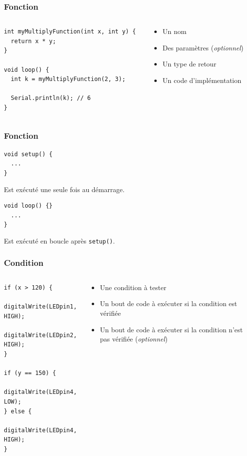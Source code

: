 \documentclass[aspectratio=169,utf8]{beamer}
\begin{document}
\begin{frame}[fragile]
  \frametitle{Fonction}
  \begin{columns}
    \begin{column}{.6\textwidth}
      \begin{lstlisting}
int myMultiplyFunction(int x, int y) {
  return x * y;
}

void loop() {
  int k = myMultiplyFunction(2, 3);

  Serial.println(k); // 6
}
      \end{lstlisting}
    \end{column}
    \begin{column}{.4\textwidth}
      \begin{itemize}
        \item Un nom
        \item Des paramètres (\emph{optionnel})
        \item Un type de retour
        \item Un code d’implémentation
      \end{itemize}
    \end{column}
  \end{columns}
\end{frame}

\begin{frame}[fragile]
  \frametitle{Fonction}
  \begin{lstlisting}
void setup() {
  ...
}
  \end{lstlisting}
  Est exécuté une seule fois au démarrage.

  \begin{lstlisting}[firstnumber=4]
void loop() {}
  ...
}
  \end{lstlisting}
  Est exécuté en boucle après \lstinline|setup()|.
\end{frame}

\begin{frame}[fragile]
\frametitle{Condition}
\begin{columns}
  \begin{column}{.5\textwidth}
    \begin{lstlisting}
if (x > 120) {
  digitalWrite(LEDpin1, HIGH);
  digitalWrite(LEDpin2, HIGH);
}

if (y == 150) {
  digitalWrite(LEDpin4, LOW);
} else {
  digitalWrite(LEDpin4, HIGH);
}
    \end{lstlisting}
  \end{column}
  \begin{column}{.5\textwidth}
    \begin{itemize}
      \item Une condition à tester
      \item Un bout de code à exécuter si la condition est vérifiée
      \item Un bout de code à exécuter si la condition n’est pas vérifiée (\emph{optionnel})
    \end{itemize}
  \end{column}
\end{columns}
\end{frame}
\end{document}
